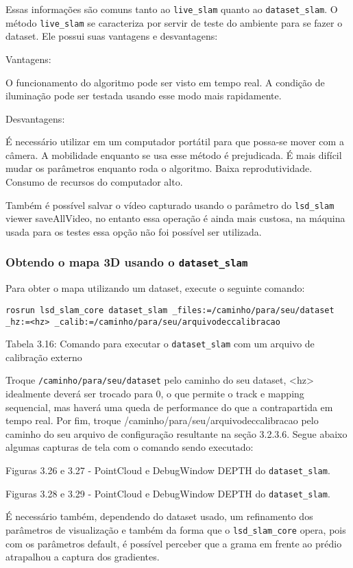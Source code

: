 Essas informações são comuns tanto ao \texttt{live\_slam} quanto ao \texttt{dataset\_slam}. O método \texttt{live\_slam} se caracteriza por servir de teste do ambiente para se fazer o dataset. Ele possui suas vantagens e desvantagens:

Vantagens:

O funcionamento do algoritmo pode ser visto em tempo real.
A condição de iluminação pode ser testada usando esse modo mais rapidamente.

Desvantagens:

É necessário utilizar em um computador portátil para que possa-se mover com a câmera.
A mobilidade enquanto se usa esse método é prejudicada.
É mais difícil mudar os parâmetros enquanto roda o algoritmo.
Baixa reprodutividade.
Consumo de recursos do computador alto.

Também é possível salvar o vídeo capturado usando o parâmetro do \texttt{lsd\_slam} viewer saveAllVideo, no entanto essa operação é ainda mais custosa, na máquina usada para os testes essa opção não foi possível ser utilizada.

\subsubsection{Obtendo o mapa 3D usando o \texttt{dataset\_slam}}

Para obter o mapa utilizando um dataset, execute o seguinte comando:

\texttt{rosrun lsd\_slam\_core dataset\_slam \_files:=/caminho/para/seu/dataset \_hz:=<hz> \_calib:=/caminho/para/seu/arquivodeccalibracao}

Tabela 3.16: Comando para executar o \texttt{dataset\_slam} com um arquivo de calibração externo

Troque \texttt{/caminho/para/seu/dataset} pelo caminho do seu dataset, <hz> idealmente deverá ser trocado para 0, o que permite o track e mapping sequencial, mas haverá uma queda de performance do que a contrapartida em tempo real. Por fim, troque /caminho/para/seu/arquivodeccalibracao pelo caminho do seu arquivo de configuração resultante na seção 3.2.3.6.
Segue abaixo algumas capturas de tela com o comando sendo executado:

Figuras 3.26 e 3.27 - PointCloud e DebugWindow DEPTH do \texttt{dataset\_slam}.

	Figuras 3.28 e 3.29 - PointCloud e DebugWindow DEPTH do \texttt{dataset\_slam}.

É necessário também, dependendo do dataset usado, um refinamento dos parâmetros de visualização e também da forma que o \texttt{lsd\_slam\_core} opera, pois com os parâmetros default, é possível perceber que a grama em frente ao prédio atrapalhou a captura dos gradientes.

